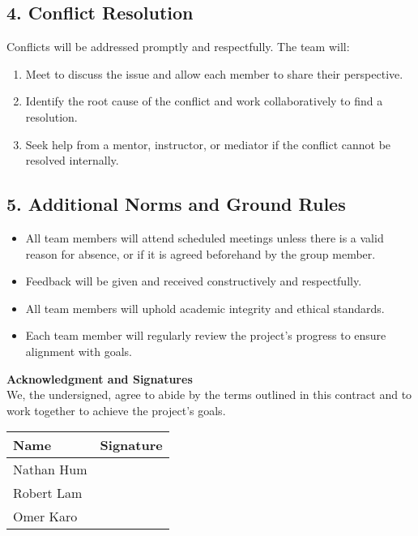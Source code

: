 \documentclass{article}
\begin{document}
\subsection*{4. Conflict Resolution}
Conflicts will be addressed promptly and respectfully. The team will:
\begin{enumerate}
    \item Meet to discuss the issue and allow each member to share their perspective.
    \item Identify the root cause of the conflict and work collaboratively to find a resolution.
    \item Seek help from a mentor, instructor, or mediator if the conflict cannot be resolved internally.
\end{enumerate}

\subsection*{5. Additional Norms and Ground Rules}
\begin{itemize}
    \item All team members will attend scheduled meetings unless there is a valid reason for absence, or if it is agreed beforehand by the group member.
    \item Feedback will be given and received constructively and respectfully.
    \item All team members will uphold academic integrity and ethical standards.
    \item Each team member will regularly review the project’s progress to ensure alignment with goals.
\end{itemize}

\vspace{0.5cm}

\noindent\textbf{Acknowledgment and Signatures}\\
We, the undersigned, agree to abide by the terms outlined in this contract and to work together to achieve the project’s goals.

\vspace{1cm}

\begin{tabular}{|p{5cm}|p{5cm}|}
\hline
\textbf{Name} & \textbf{Signature} \\
\hline
Nathan Hum & \hspace{4cm} \\[1cm]
\hline
Robert Lam & \hspace{4cm} \\[1cm]
\hline
Omer Karo & \hspace{4cm} \\[1cm]
\hline
\end{tabular}
\end{document}
